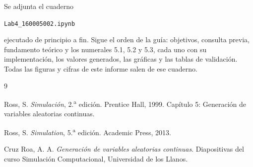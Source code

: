 \documentclass[11pt,letterpaper]{article}
\newcommand{\codigoEstudiante}{160005002}
\begin{document}
Se adjunta el cuaderno

\begin{center}
\texttt{Lab4\_\codigoEstudiante.ipynb}
\end{center}

\noindent ejecutado de principio a fin. Sigue el orden de la guía: objetivos, consulta previa,
fundamento teórico y los numerales 5.1, 5.2 y 5.3, cada uno con su implementación, los valores
generados, las gráficas y las tablas de validación. Todas las figuras y cifras de este informe salen de
ese cuaderno.

\begin{thebibliography}{9}

Ross, S. \emph{Simulación}, 2.\textsuperscript{a} edición. Prentice Hall, 1999. Capítulo 5:
Generación de variables aleatorias continuas.

Ross, S. \emph{Simulation}, 5.\textsuperscript{a} edición. Academic Press, 2013.

Cruz Roa, A. A. \emph{Generación de variables aleatorias continuas}. Diapositivas del curso
Simulación Computacional, Universidad de los Llanos.

\end{thebibliography}
\end{document}
